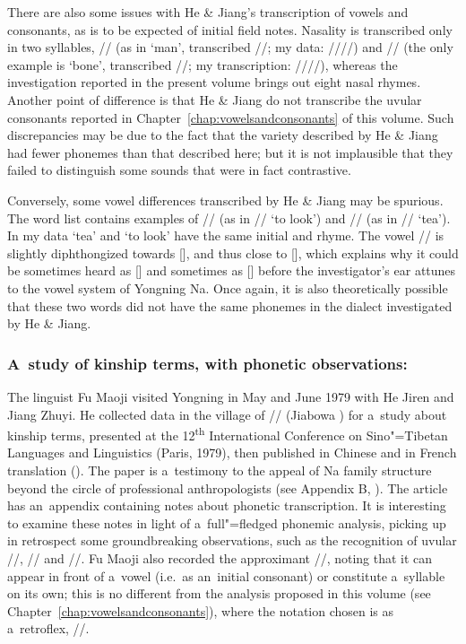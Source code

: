   
There are also some issues with He \& Jiang’s transcription of vowels and consonants, as is to be
expected of initial field notes. Nasality is transcribed only in two syllables, // (as in
‘man’, transcribed //; my data: ////) and // (the only example is ‘bone’,
transcribed //; my transcription: ////), whereas the investigation reported
in the present volume brings out eight nasal rhymes. Another point of difference is that He \&
Jiang do not transcribe the uvular consonants reported in Chapter~\ref{chap:vowelsandconsonants} of this volume. Such
discrepancies may be due to the fact that the variety described by He \& Jiang had fewer phonemes
than that described here; but it is not implausible that they failed to distinguish some sounds that
were in fact contrastive.

Conversely, some vowel differences transcribed by He \& Jiang may be spurious. The word list
contains examples of // (as in // ‘to look’) and // (as in //
‘tea’). In my data ‘tea’ and ‘to look’ have the same initial and rhyme. The vowel // is
slightly diphthongized towards [], and thus close to [], which explains why it could be
sometimes heard as [] and sometimes as [] before the investigator’s ear attunes to the
vowel system of Yongning Na. Once again, it is also theoretically possible that these two words did
not have the same phonemes in the dialect investigated by He \& Jiang.


\subsubsection{A~study of kinship terms, with phonetic observations: \citet{fu1980}}
\label{sec:fu1980astudyofkinshipterms}

The linguist Fu Maoji  visited Yongning in May and June 1979 with He Jiren and Jiang Zhuyi. He collected data in the
village of // (Jiabowa ) for a~study about kinship terms, presented at the 12\textsuperscript{th} International Conference on {Sino"=Tibetan} Languages and Linguistics (Paris,
1979), then published in Chinese and in {French} translation (\citealt{fu1980,fu1983}). The paper is a~testimony to the appeal of Na family structure beyond the circle of professional anthropologists (see Appendix B, ). The article has an~appendix containing notes about phonetic transcription. It is interesting to examine these notes in light of a~full"=fledged phonemic analysis, picking up in retrospect some groundbreaking observations, such as the recognition of uvular //, // and //. Fu Maoji also recorded the approximant //, noting that it can appear in front of a~vowel (i.e.\ as an~initial consonant) or constitute a~syllable on its own; this is no different from the analysis proposed in this volume (see Chapter~\ref{chap:vowelsandconsonants}), where the notation chosen is as a~retroflex, //. 

